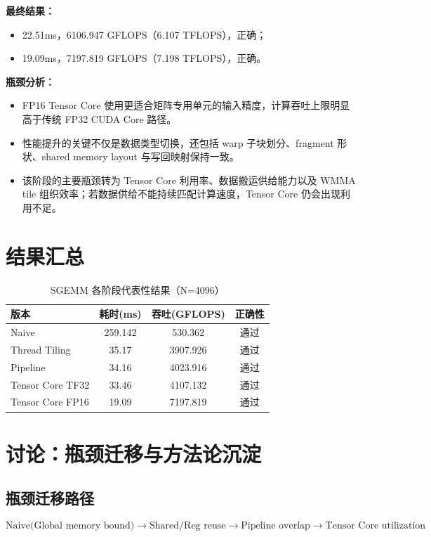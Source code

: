 \documentclass[12pt,a4paper]{ctexart}
\begin{document}
\textbf{最终结果：}
\begin{itemize}[leftmargin=2em]
  \item 22.51ms，6106.947 GFLOPS（6.107 TFLOPS），正确；
  \item 19.09ms，7197.819 GFLOPS（7.198 TFLOPS），正确。
\end{itemize}

\textbf{瓶颈分析：}
\begin{itemize}[leftmargin=2em]
  \item FP16 Tensor Core 使用更适合矩阵专用单元的输入精度，计算吞吐上限明显高于传统 FP32 CUDA Core 路径。
  \item 性能提升的关键不仅是数据类型切换，还包括 warp 子块划分、fragment 形状、shared memory layout 与写回映射保持一致。
  \item 该阶段的主要瓶颈转为 Tensor Core 利用率、数据搬运供给能力以及 WMMA tile 组织效率；若数据供给不能持续匹配计算速度，Tensor Core 仍会出现利用不足。
\end{itemize}

\section{结果汇总}
\begin{table}[h]
\centering
\caption{SGEMM 各阶段代表性结果（N=4096）}
\begin{tabular}{lccc}
\toprule
版本 & 耗时(ms) & 吞吐(GFLOPS) & 正确性 \\
\midrule
Naive & 259.142 & 530.362 & 通过 \\
Thread Tiling & 35.17 & 3907.926 & 通过 \\
Pipeline & 34.16 & 4023.916 & 通过 \\
Tensor Core TF32 & 33.46 & 4107.132 & 通过 \\
Tensor Core FP16 & 19.09 & 7197.819 & 通过 \\
\bottomrule
\end{tabular}
\end{table}

\section{讨论：瓶颈迁移与方法论沉淀}
\subsection{瓶颈迁移路径}
\[
\text{Naive(Global memory bound)}
\rightarrow
\text{Shared/Reg reuse}
\rightarrow
\text{Pipeline overlap}
\rightarrow
\text{Tensor Core utilization}
\]
\end{document}
